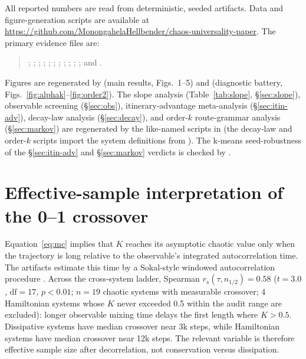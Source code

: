 \documentclass[aip,cha,preprint,amsmath,amssymb,floatfix]{revtex4-2}
\begin{document}
All reported numbers are read from deterministic, seeded artifacts. Data and figure-generation scripts are available at
\url{https://github.com/MonongahelaHellbender/chaos-universality-paper}. The primary evidence files are:
\begin{quote}
\small\raggedright
{};
;
;
;
;
;
;
;
;
;
; and
.
\end{quote}
Figures are regenerated by  (main results,
Figs.~1--5) and  (diagnostic battery,
Figs.~\ref{fig:alphak}--\ref{fig:order2}). The slope analysis
(Table~\ref{tab:slope}, \S\ref{sec:slope}), observable screening
(\S\ref{sec:obs}), itinerary-advantage meta-analysis (\S\ref{sec:itin-adv}),
decay-law analysis (\S\ref{sec:decay}), and order-$k$ route-grammar analysis
(\S\ref{sec:markov}) are regenerated by the like-named scripts in
 (the decay-law and order-$k$ scripts import the system
definitions from ). The k-means seed-robustness of
the \S\ref{sec:itin-adv} and \S\ref{sec:markov} verdicts is checked by
.

\appendix

\section{Effective-sample interpretation of the 0--1 crossover}

Equation~\eqref{eq:mc} implies that $K$ reaches its asymptotic chaotic value only
when the trajectory is long relative to the observable's integrated
autocorrelation time. The artifacts estimate this time by a Sokal-style windowed
autocorrelation procedure \cite{sokal1997}. Across the cross-system ladder,
Spearman $r_s(\tau,n_{1/2})=0.58$ ($t=3.0$, $\mathrm{df}=17$, $p<0.01$; $n=19$
chaotic systems with measurable crossover; 4 Hamiltonian systems whose $K$ never
exceeded 0.5 within the audit range are excluded):
longer observable mixing time delays the first length where $K>0.5$.
Dissipative systems have median crossover near 3k steps,
while Hamiltonian systems have median crossover near 12k steps. The relevant
variable is therefore effective sample size after decorrelation, not conservation
versus dissipation.
\end{document}
